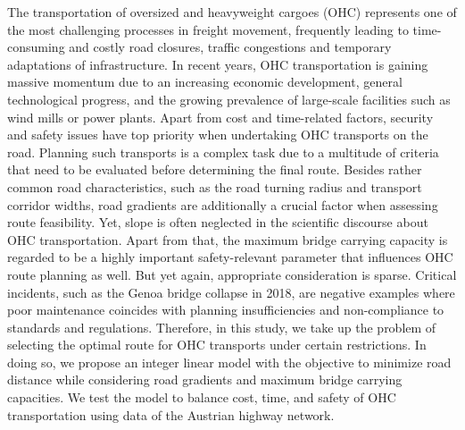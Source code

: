 
The transportation of oversized and heavyweight cargoes (OHC) represents one of the most challenging processes in freight movement, frequently leading to time-consuming and costly road closures, traffic congestions and temporary adaptations of infrastructure. In recent years, OHC transportation is gaining massive momentum due to an increasing economic development, general technological progress, and the growing prevalence of large-scale facilities such as wind mills or power plants. Apart from cost and time-related factors, security and safety issues have top priority when undertaking OHC transports on the road. Planning such transports is a complex task due to a multitude of criteria that need to be evaluated before determining the final route. Besides rather common road characteristics, such as the road turning radius and transport corridor widths, road gradients are additionally  a crucial factor when assessing route feasibility. Yet, slope is often neglected in the scientific discourse about OHC transportation. Apart from that, the maximum bridge carrying capacity is regarded to be a highly important safety-relevant parameter that influences OHC route planning as well. But yet again, appropriate consideration is sparse. Critical incidents, such as the Genoa bridge collapse in 2018, are negative examples where poor maintenance coincides with planning insufficiencies and non-compliance to standards and regulations. Therefore, in this study, we take up the problem of selecting the optimal route for OHC transports under certain restrictions. In doing so, we propose an integer linear model with the objective to minimize road distance while considering road gradients and maximum bridge carrying capacities. We test the model to balance cost, time, and safety of OHC transportation using data of the Austrian highway network.
